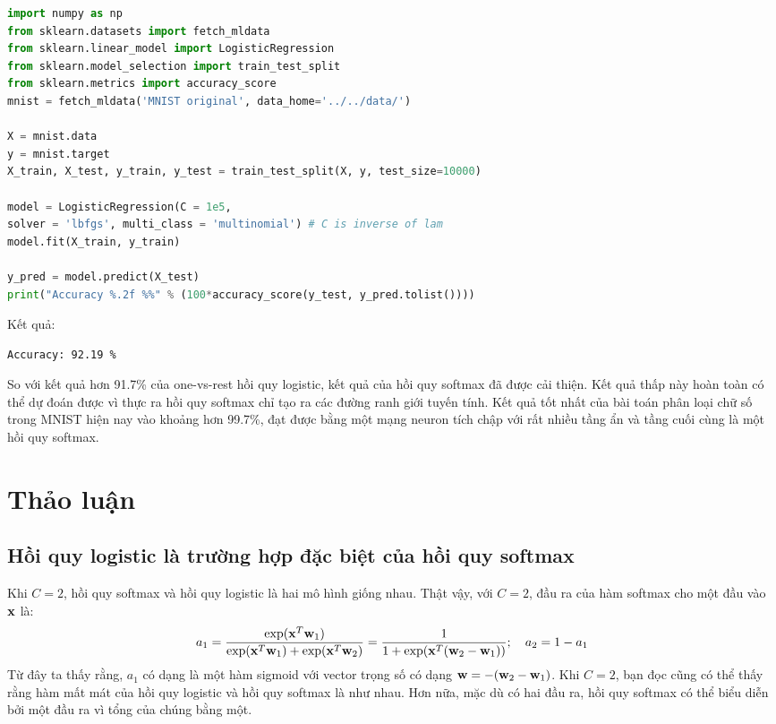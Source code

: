 \begin{lstlisting}[language=Python]
import numpy as np
from sklearn.datasets import fetch_mldata
from sklearn.linear_model import LogisticRegression
from sklearn.model_selection import train_test_split
from sklearn.metrics import accuracy_score
mnist = fetch_mldata('MNIST original', data_home='../../data/')

X = mnist.data
y = mnist.target
X_train, X_test, y_train, y_test = train_test_split(X, y, test_size=10000)

model = LogisticRegression(C = 1e5,
solver = 'lbfgs', multi_class = 'multinomial') # C is inverse of lam
model.fit(X_train, y_train)

y_pred = model.predict(X_test)
print("Accuracy %.2f %%" % (100*accuracy_score(y_test, y_pred.tolist())))
\end{lstlisting}
Kết quả:
\begin{lstlisting}
Accuracy: 92.19 %
\end{lstlisting}

So với kết quả hơn 91.7\% của one-vs-rest hồi quy logistic, kết quả
của hồi quy softmax đã được cải thiện. Kết quả thấp này hoàn toàn có thể dự đoán được vì thực ra hồi quy softmax chỉ tạo ra các đường
ranh giới tuyến tính. Kết quả tốt nhất của bài toán phân loại chữ
số trong MNIST hiện nay vào khoảng hơn 99.7\%, đạt được bằng một mạng neuron tích chập với rất nhiều tầng ẩn và tầng cuối cùng là một
hồi quy softmax.


\section{Thảo luận }

\subsection{Hồi quy logistic là trường hợp đặc biệt của hồi quy softmax}

Khi $C = 2$, hồi quy softmax và hồi quy logistic là hai mô hình giống nhau. Thật vậy,
với $C = 2$, đầu ra của hàm softmax cho một đầu vào $\mathbf{x}$ là:
\begin{equation}
a_1 = \frac{\exp(\mathbf{x}^T\mathbf{w}_1)} {\exp(\mathbf{x}^T\mathbf{w}_1) +
\exp(\mathbf{x}^T\mathbf{w}_2)}
= \frac{1}{1 + \exp(\mathbf{x}^T(\mathbf{w}_2 - \mathbf{w}_1))};\quad a_2 = 1 -
a_1
\end{equation}
Từ đây ta thấy rằng, $a_1$ có dạng là một hàm sigmoid với vector trọng số có dạng $\mathbf{w} =
-(\mathbf{w}_2 - \mathbf{w}_1)$.
Khi $C = 2$, bạn đọc cũng có thể thấy rằng hàm mất mát của hồi quy logistic
và hồi quy softmax là như nhau. Hơn nữa, mặc dù có hai đầu ra, hồi quy softmax có thể biểu diễn bởi một đầu ra vì tổng của chúng bằng một.


